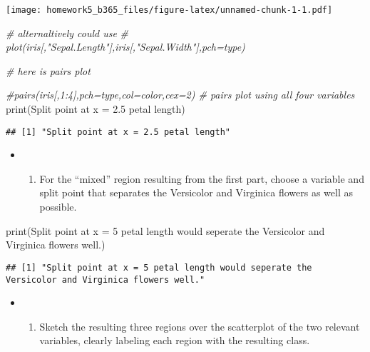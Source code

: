 \documentclass[
]{article}
\newenvironment{Shaded}{\begin{snugshade}}{\end{snugshade}}
\newcommand{\CommentTok}[1]{\textcolor[rgb]{0.56,0.35,0.01}{\textit{#1}}}
\newcommand{\FunctionTok}[1]{\textcolor[rgb]{0.00,0.00,0.00}{#1}}
\newcommand{\NormalTok}[1]{#1}
\newcommand{\StringTok}[1]{\textcolor[rgb]{0.31,0.60,0.02}{#1}}
\providecommand{\tightlist}{%
  \setlength{\itemsep}{0pt}\setlength{\parskip}{0pt}}
\begin{document}
\texttt{[image: homework5\_b365\_files/figure-latex/unnamed-chunk-1-1.pdf]}

\begin{Shaded}
\begin{Highlighting}[]
\CommentTok{\# alternaltively could use}
\CommentTok{\# plot(iris[,"Sepal.Length"],iris[,"Sepal.Width"],pch=type)}

\CommentTok{\# here is pairs plot}


\CommentTok{\#pairs(iris[,1:4],pch=type,col=color,cex=2)   \# pairs plot using all four variables}
\FunctionTok{print}\NormalTok{(}\StringTok{\textquotesingle{}Split point at x = 2.5 petal length\textquotesingle{}}\NormalTok{)}
\end{Highlighting}
\end{Shaded}

\begin{verbatim}
## [1] "Split point at x = 2.5 petal length"
\end{verbatim}

\begin{itemize}
\item
  \begin{enumerate}
  \def\labelenumi{\alph{enumi})}
  \setcounter{enumi}{1}
  \tightlist
  \item
    For the ``mixed'' region resulting from the first part, choose a
    variable and split point that separates the Versicolor and Virginica
    flowers as well as possible.
  \end{enumerate}
\end{itemize}

\begin{Shaded}
\begin{Highlighting}[]
\FunctionTok{print}\NormalTok{(}\StringTok{\textquotesingle{}Split point at x = 5 petal length would seperate the Versicolor and Virginica flowers well.\textquotesingle{}}\NormalTok{)}
\end{Highlighting}
\end{Shaded}

\begin{verbatim}
## [1] "Split point at x = 5 petal length would seperate the Versicolor and Virginica flowers well."
\end{verbatim}

\begin{itemize}
\item
  \begin{enumerate}
  \def\labelenumi{\alph{enumi})}
  \setcounter{enumi}{2}
  \tightlist
  \item
    Sketch the resulting three regions over the scatterplot of the two
    relevant variables, clearly labeling each region with the resulting
    class.
  \end{enumerate}
\end{itemize}
\end{document}
